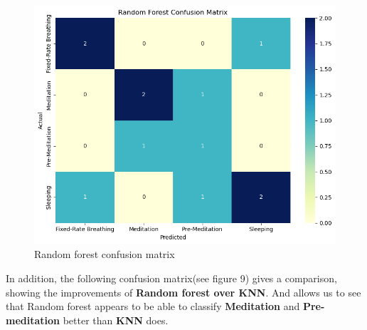 \documentclass[
  11pt,
]{ieee}
\begin{document}
\begin{figure}

{\centering \includegraphics{picture_use_ml/8_Confusion Matrix_ Random Forest.png}

}

\caption{Random forest confusion matrix}

\end{figure}%

In addition, the following confusion matrix(see figure 9) gives a
comparison, showing the improvements of \textbf{Random forest over KNN}.
And allows us to see that Random forest appears to be able to classify
\textbf{Meditation} and \textbf{Pre-meditation} better than \textbf{KNN}
does.
\end{document}

